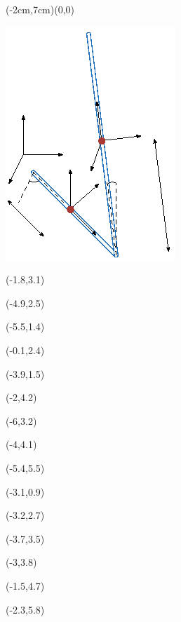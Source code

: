 \documentclass{article}
\begin{document}
\small

\begin{psdraw}(-2cm,7cm)(0,0)

\includegraphics[width=0.5\linewidth]{rotary_pendulum}


\move(-1.8,3.1)

\move(-4.9,2.5)

\move(-5.5,1.4)

\move(-0.1,2.4)

\move(-3.9,1.5)

\move(-2,4.2)

\move(-6,3.2)

\move(-4,4.1)

\move(-5.4,5.5)

\move(-3.1,0.9)

\move(-3.2,2.7)

\move(-3.7,3.5)

\move(-3,3.8)

\move(-1.5,4.7)

\move(-2.3,5.8)

\end{psdraw}
\end{document}

